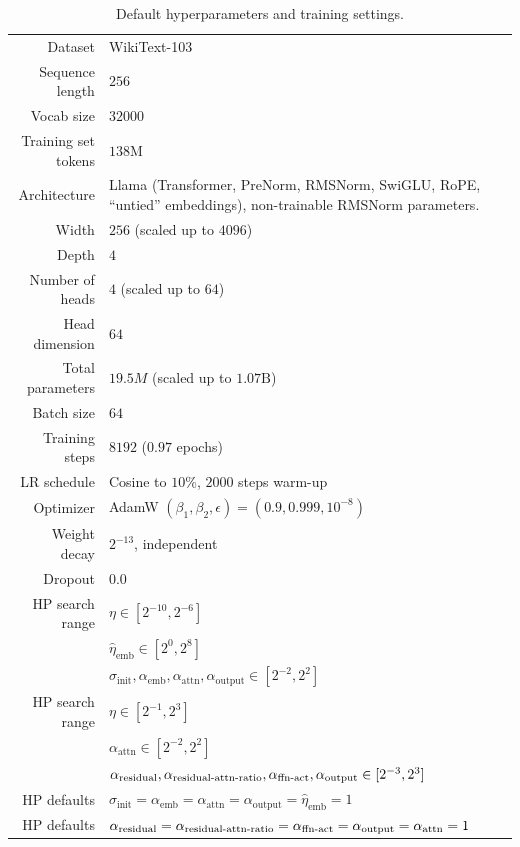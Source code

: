 \begin{table}[h] 
    \centering
    \renewcommand{\arraystretch}{1.25}
    \begin{tabular}{|r|p{10cm}|}
    \hline
        Dataset & WikiText-103 \citep{WikiText103} \\
        Sequence length & $256$ \\
        Vocab size & $32000$ \\
        Training set tokens & $138\mathrm{M}$ \\
        \hline
        Architecture & Llama \citep{Llama} \; (Transformer, PreNorm, RMSNorm, SwiGLU, RoPE, ``untied'' embeddings), non-trainable RMSNorm parameters. \\
        Width & $256$ \; (scaled up to $4096$) \\
        Depth & $4$ \\
        Number of heads & $4$ \; (scaled up to $64$) \\
        Head dimension & $64$ \\
        Total parameters & $19.5M$ \; (scaled up to $1.07\mathrm{B}$)\\
        \hline
        Batch size & $64$ \\
        Training steps & $8192$ ($0.97$ epochs) \\
        LR schedule & Cosine to $10\%$, $2000$ steps warm-up \\
        Optimizer & AdamW $(\beta_1, \beta_2, \epsilon) = (0.9, 0.999, 10^{-8})$ \\
        Weight decay & $2^{-13}$, independent \citep{Independent_WD} \\
        Dropout & $0.0$ \\
        \hline
         \mup{} HP search range &
        $\eta \in [2^{-10}, 2^{-6}]$\\
        &$\hat{\eta}_{\mathrm{emb}} \in [2^{0}, 2^{8}]$\\
        &$\sigma_{\mathrm{init}},
        \alpha_{\mathrm{emb}},
        \alpha_\mathrm{{attn}},
        \alpha_{\mathrm{output}} \in [2^{-2}, 2^{2}]$\\
        \umup{} HP search range &
        $\eta \in [2^{-1}, 2^{3}]$\\
        &$\alpha_{\mathrm{attn}} \in [2^{-2}, 2^{2}]$\\
        &$\alpha_{\mathrm{residual}},\alpha_{\mathrm{residual{\text -}attn{\text -}ratio}},\alpha_{\mathrm{ffn{\text -}act}},\alpha_{\mathrm{output}} \in [2^{-3}, 2^{3}]$\\
         \hline
        \mup{} HP defaults &
        $\sigma_{\mathrm{init}}=
        \alpha_{\mathrm{emb}}=
        \alpha_\mathrm{{attn}}=
        \alpha_{\mathrm{output}}=
        \hat{\eta}_{\mathrm{emb}}=1$\\
        \umup{} HP defaults &
        $\alpha_{\mathrm{residual}}=
        \alpha_{\mathrm{residual{\text -}attn{\text -}ratio}}=
        \alpha_{\mathrm{ffn{\text -}act}}=
        \alpha_{\mathrm{output}}=
        \alpha_{\mathrm{attn}}=1$\\
    \hline
    \end{tabular}
    \caption{Default hyperparameters and training settings.}
    \label{tab:experiment_defaults}
\end{table}


